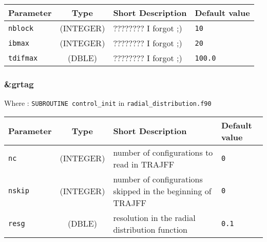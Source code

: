 \documentclass[a4paper]{article}
\begin{document}
\begin{longtable}{l|c|m{8cm}|m{2cm}}
\hline
\hline
Parameter        &  Type              &          Short Description                                                          & Default value \\
\hline
\hline
\rule[-0.75cm]{0cm}{1.5cm}
\verb?nblock?    & (INTEGER)          & ???????? I forgot ;)                                                                & \verb?10? \\
\hline
\rule[-0.75cm]{0cm}{1.5cm}
\verb?ibmax?     &  (INTEGER)         & ???????? I forgot ;)                                                                & \verb?20? \\
\hline
\rule[-0.75cm]{0cm}{1.5cm}
\verb?tdifmax?   & (DBLE)             & ???????? I forgot ;)                                                                & \verb?100.0? \\
\hline
\hline
\end{longtable}


\subsubsection{\&grtag}

Where : \verb?SUBROUTINE control_init? in \verb?radial_distribution.f90?
\newline

\begin{longtable}{l|c|m{8cm}|m{2cm}}
\hline
\hline
Parameter        &  Type              &          Short Description                                                          & Default value \\
\hline
\hline
\rule[-0.75cm]{0cm}{1.5cm}
\verb?nc?        & (INTEGER)          & number of configurations to read in TRAJFF                                          & \verb?0? \\
\rule[-0.75cm]{0cm}{1.5cm}
\verb?nskip?     & (INTEGER)          & number of configurations skipped in the beginning of TRAJFF                         & \verb?0? \\
\rule[-0.75cm]{0cm}{1.5cm}
\verb?resg?      & (DBLE)             & resolution in the radial distribution function                                      & \verb?0.1? \\
\hline
\hline
\end{longtable}
\end{document}
